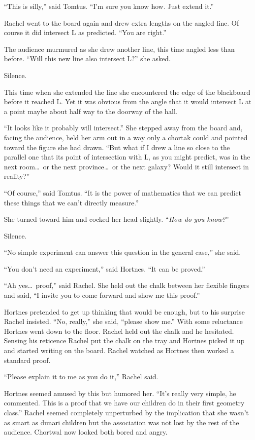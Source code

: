 ``This is silly,'' said Tomtus. ``I'm sure you know how. Just extend it.''

Rachel went to the board again and drew extra lengths on the angled line. Of course it did
intersect L as predicted. ``You are right.''

The audience murmured as she drew another line, this time angled less than before. ``Will this
new line also intersect L?'' she asked.

Silence.

This time when she extended the line she encountered the edge of the blackboard before it
reached L. Yet it was obvious from the angle that it would intersect L at a point maybe about
half way to the doorway of the hall.

``It looks like it probably will intersect.'' She stepped away from the board and, facing the
audience, held her arm out in a way only a chortak could and pointed toward the figure she had
drawn. ``But what if I drew a line so close to the parallel one that its point of intersection
with L, as you might predict, was in the next room\ldots\ or the next province\ldots\ or the
next galaxy? Would it still intersect in reality?''

``Of course,'' said Tomtus. ``It is the power of mathematics that we can predict these things
that we can't directly measure.''

She turned toward him and cocked her head slightly. ``\emph{How do you know?}''

Silence.

``No simple experiment can answer this question in the general case,'' she said.

``You don't need an experiment,'' said Hortnes. ``It can be proved.''

``Ah yes\ldots\ proof,'' said Rachel. She held out the chalk between her flexible fingers and
said, ``I invite you to come forward and show me this proof.''

Hortnes pretended to get up thinking that would be enough, but to his surprise Rachel insisted.
``No, really,'' she said, ``please show me.'' With some reluctance Hortnes went down to the
floor. Rachel held out the chalk and he hesitated. Sensing his reticence Rachel put the chalk on
the tray and Hortnes picked it up and started writing on the board. Rachel watched as Hortnes
then worked a standard proof.

``Please explain it to me as you do it,'' Rachel said.

Hortnes seemed amused by this but humored her. ``It's really very simple, he commented. This is
a proof that we have our children do in their first geometry class.'' Rachel seemed completely
unperturbed by the implication that she wasn't as smart as dunari children but the association
was not lost by the rest of the audience. Chortwal now looked both bored and angry.


